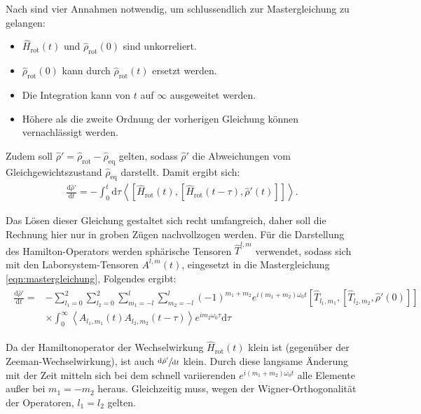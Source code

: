 Nach \cite[S. 276]{spiess} sind vier Annahmen notwendig, um schlussendlich zur Mastergleichung zu gelangen:
\begin{itemize}
\item $\hat{H}_\text{rot}(t)$ und $\hat{\rho}_\text{rot}(0)$ sind unkorreliert.
\item $\hat{\rho}_\text{rot}(0)$ kann durch $\hat{\rho}_\text{rot}(t)$ ersetzt werden.
\item Die Integration kann von $t$ auf $\infty$ ausgeweitet werden.
\item Höhere als die zweite Ordnung der vorherigen Gleichung können vernachlässigt werden.
\end{itemize}
Zudem soll $\hat{\rho}' = \hat{\rho}_\text{rot} - \hat{\rho}_\text{eq}$ gelten, sodass $\hat{\rho}'$ die Abweichungen vom Gleichgewichtszustand $\hat{\rho}_\text{eq}$ darstellt.
Damit ergibt sich:
\begin{align}
    \frac{\text{d} \hat{\rho}'}{\text{d}t} = - \int_0^t \text{d} \tau \left< \left[\hat{H}_\text{rot}(t), [\hat{H}_\text{rot}(t-\tau), \hat{\rho}'(t)] \right] \right>. \label{eqn:mastergleichung}
\end{align}

Das Lösen dieser Gleichung gestaltet sich recht umfangreich, daher soll die Rechnung hier nur in groben Zügen nachvollzogen werden.
Für die Darstellung des Hamilton-Operators werden sphärische Tensoren $\hat{T}^{l,m}$ verwendet, sodass sich mit den Laborsystem-Tensoren $A^{l,m}(t)$, eingesetzt in die Mastergleichung \eqref{eqn:mastergleichung}, Folgendes ergibt:
\begin{align}
\begin{split}
    \frac{\text{d} \hat{\rho}'}{\text{d}t} =& -\sum_{l_1 = 0}^2 \sum_{l_2 = 0}^2 \sum_{m_1 = -l}^l \sum_{m_2 = -l}^l (-1)^{m_1+m_2} e^{i(m_1+m_2) \omega_0 t} \left[\hat{T}_{l_1,m_1}, [\hat{T}_{l_2,m_2}, \hat{\rho}'(0)] \right] \\ &\times \int_0^\infty \left< A_{l_1,m_1}(t) A_{l_2,m_2}(t-\tau) \right> e^{i m_2 \omega_0 \tau} \text{d} \tau
\end{split}
\end{align}

Da der Hamiltonoperator der Wechselwirkung $\hat{H}_\text{rot}(t)$ klein ist (gegenüber der Zeeman-Wechselwirkung), ist auch $\sfrac{\text{d} \hat{\rho}'}{\text{d}t}$ klein. Durch diese langsame Änderung mit der Zeit mitteln sich bei dem schnell variierenden $e^{i(m_1+m_2) \omega_0 t}$ alle Elemente außer bei $m_1 = - m_2$ heraus. Gleichzeitig muss, wegen der Wigner-Orthogonalität der Operatoren, $l_1 = l_2$ gelten.

